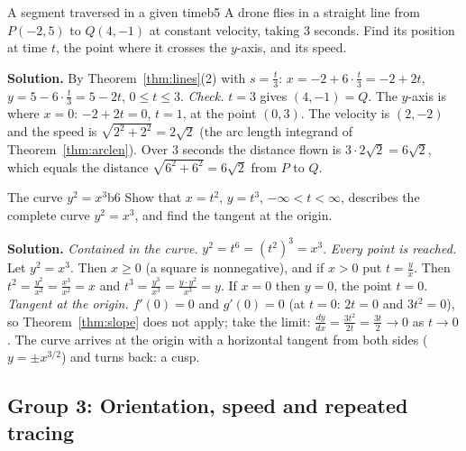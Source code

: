 \documentclass[11pt]{article}
\begin{document}
\begin{exmp}{A segment traversed in a given time}{b5}
A drone flies in a straight line from $P(-2,5)$ to $Q(4,-1)$ at constant velocity, taking $3$ seconds. Find its position at time $t$, the point where it crosses the $y$-axis, and its speed.

\textbf{Solution.} By Theorem~\ref{thm:lines}(2) with $s=\frac t3$: $x=-2+6\cdot\frac t3=-2+2t$, $y=5-6\cdot\frac t3=5-2t$, $0\le t\le3$. \emph{Check.} $t=3$ gives $(4,-1)=Q$. The $y$-axis is where $x=0$: $-2+2t=0$, $t=1$, at the point $(0,3)$. The velocity is $(2,-2)$ and the speed is $\sqrt{2^2+2^2}=2\sqrt2$ (the arc length integrand of Theorem~\ref{thm:arclen}). Over $3$ seconds the distance flown is $3\cdot2\sqrt2=6\sqrt2$, which equals the distance $\sqrt{6^2+6^2}=6\sqrt2$ from $P$ to $Q$.
\end{exmp}

\begin{exmp}{The curve $y^2=x^3$}{b6}
Show that $x=t^2$, $y=t^3$, $-\infty<t<\infty$, describes the complete curve $y^2=x^3$, and find the tangent at the origin.

\textbf{Solution.} \emph{Contained in the curve.} $y^2=t^6=(t^2)^3=x^3$. \emph{Every point is reached.} Let $y^2=x^3$. Then $x\ge0$ (a square is nonnegative), and if $x>0$ put $t=\frac yx$. Then $t^2=\frac{y^2}{x^2}=\frac{x^3}{x^2}=x$ and $t^3=\frac{y^3}{x^3}=\frac{y\cdot y^2}{x^3}=y$. If $x=0$ then $y=0$, the point $t=0$. \emph{Tangent at the origin.} $f'(0)=0$ and $g'(0)=0$ (at $t=0$: $2t=0$ and $3t^2=0$), so Theorem~\ref{thm:slope} does not apply; take the limit: $\frac{dy}{dx}=\frac{3t^2}{2t}=\frac{3t}2\to0$ as $t\to0$. The curve arrives at the origin with a horizontal tangent from both sides ($y=\pm x^{3/2}$) and turns back: a cusp.
\end{exmp}

\subsection*{Group 3: Orientation, speed and repeated tracing}
\end{document}
